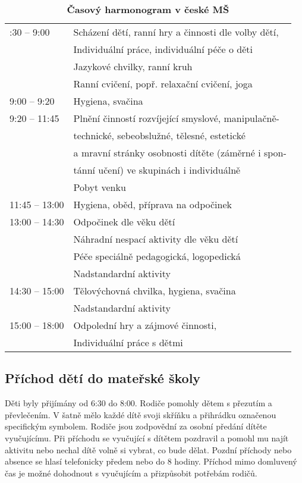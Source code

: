 		\begin{spacing}{1.0}
		\begin{table}[h!]
			\center
			\begin{tabular}{|l l|}
				\rowcolor{white}
				\hline
			6:30 – 9:00				& Scházení dětí, ranní hry a činnosti dle volby dětí, 	\\ 
									& Individuální práce, individuální péče o děti\\
									& Jazykové chvilky, ranní kruh 	\\
									& Ranní cvičení, popř. relaxační cvičení, joga \\
			9:00 – 9:20				& Hygiena, svačina	\\
			9:20 – 11:45			& Plnění činností rozvíjející smyslové, manipulačně-	\\
									& technické, sebeobslužné, tělesné, estetické \\
									& a mravní stránky osobnosti dítěte (záměrné i spon- \\
									& tánní učení) ve skupinách i individuálně \\
									& Pobyt venku					\\
			11:45 – 13:00			& Hygiena, oběd, příprava na odpočinek					\\
			13:00 – 14:30			& Odpočinek dle věku dětí						\\
									& Náhradní nespací aktivity dle věku dětí 				\\
									& Péče speciálně pedagogická, logopedická				\\ 
									& Nadstandardní aktivity 							 \\
			14:30 – 15:00			& Tělovýchovná chvilka, hygiena, svačina 			\\
									& Nadstandardní aktivity 		\\
			15:00 – 18:00			& Odpolední hry a zájmové činnosti, \\
									& Individuální práce s dětmi\\
			\hline
			\end{tabular}
			\caption{ \textbf{Časový harmonogram v české MŠ}
			}
			\label{tab:rezimDneCR}
		\end{table}
		\end{spacing}

		\subsection{Příchod dětí do mateřské školy}
			
			Děti byly přijímány od 6:30 do 8:00. Rodiče pomohly dětem s přezutím a převlečením. V šatně mělo každé dítě svoji skříňku a přihrádku označenou specifickým symbolem. Rodiče jsou zodpovědní za osobní předání dítěte vyučujícímu. Při příchodu se vyučující s dítětem pozdravil a pomohl mu najít aktivitu nebo nechal dítě volně si vybrat, co bude dělat. Pozdní příchody nebo absence se hlasí telefonicky předem nebo do 8 hodiny. Příchod mimo domluvený čas je možné dohodnout s vyučujícím a přizpůsobit potřebám rodičů.


